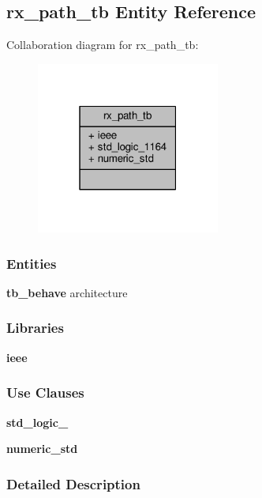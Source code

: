 \subsection{rx\+\_\+path\+\_\+tb Entity Reference}
\label{classrx__path__tb}


Collaboration diagram for rx\+\_\+path\+\_\+tb\+:\nopagebreak
\begin{figure}[H]
\begin{center}
\leavevmode
\includegraphics[width=171pt]{d6/d33/classrx__path__tb__coll__graph}
\end{center}
\end{figure}
\subsubsection*{Entities}
\begin{DoxyCompactItemize}
\item 
{\bf tb\+\_\+behave} architecture
\end{DoxyCompactItemize}
\subsubsection*{Libraries}
 \begin{DoxyCompactItemize}
\item 
{\bf ieee} 
\end{DoxyCompactItemize}
\subsubsection*{Use Clauses}
 \begin{DoxyCompactItemize}
\item 
{\bf std\+\_\+logic\+\_}   
\item 
{\bf numeric\+\_\+std}   
\end{DoxyCompactItemize}


\subsubsection{Detailed Description}


